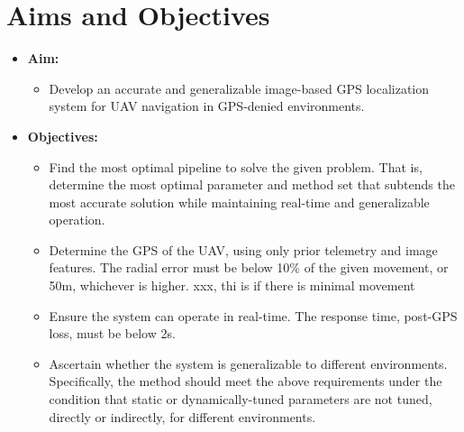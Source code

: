 \section{Aims and Objectives}
\begin{itemize}
    \item \textbf{Aim:}
    \begin{itemize}
        \item Develop an accurate and generalizable image-based GPS localization system for UAV navigation in GPS-denied environments. 
    \end{itemize}
    \item \textbf{Objectives:}
    \begin{itemize}
        \item Find the most optimal pipeline to solve the given problem. That is, determine the most optimal parameter and method set that subtends the most accurate solution while maintaining real-time and generalizable operation.
        \item Determine the GPS of the UAV, using only prior telemetry and image features. The radial error must be below 10\% of the given movement, or 50m, whichever is higher. xxx, thi is if there is minimal movement
        \item Ensure the system can operate in real-time. The response time, post-GPS loss, must be below 2s. 
        \item Ascertain whether the system is generalizable to different environments. Specifically, the method should meet the above requirements under the condition that static or dynamically-tuned parameters are not tuned, directly or indirectly, for different environments.
    \end{itemize}
\end{itemize}

